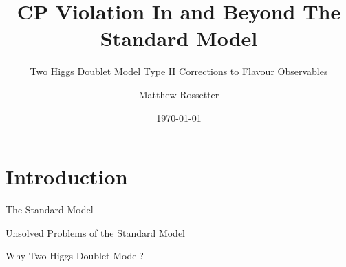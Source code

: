 \documentclass[10pt,xcolor={table,dvipsnames},t]{beamer}
\title{CP Violation In and Beyond The Standard Model}
\subtitle{Two Higgs Doublet Model Type II Corrections to Flavour Observables}
\author{Matthew Rossetter}
\institute{}
\date{\today}
\begin{document}
\section{Introduction}
\begin{frame}
  \titlepage
\end{frame}

\begin{frame}{The Standard Model}

\end{frame}

\begin{frame}{Unsolved Problems of the Standard Model}

\end{frame}

\begin{frame}{Why Two Higgs Doublet Model?}

\end{frame}
\end{document}
